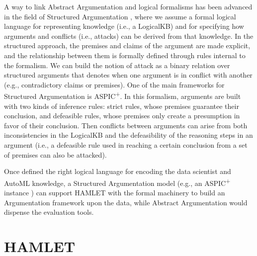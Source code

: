 A way to link Abstract Argumentation and logical formalisms has been advanced in the field of Structured Argumentation \cite{BesnardGHMPST14structured}, where we assume a formal logical language for representing knowledge (i.e., a LogicalKB) and for specifying how arguments and conflicts (i.e., attacks) can be derived from that knowledge. 
In the structured approach, the premises and claims of the argument are made explicit, and the relationship between them is formally defined through rules internal to the formalism.
We can build the notion of attack as a binary relation over structured arguments that denotes when one argument is in conflict with another (e.g., contradictory claims or premises).
One of the main frameworks for Structured Argumentation is ASPIC\textsuperscript{+}\cite{Modgil2014aspic+}.
In this formalism, arguments are built with two kinds of inference rules: strict rules, whose premises guarantee their conclusion, and defeasible rules, whose premises only create a presumption in favor of their conclusion.
Then conflicts between arguments can arise from both inconsistencies in the LogicalKB and the defeasibility of the reasoning steps in an argument (i.e., a defeasible rule used in reaching a certain conclusion from a set of premises can also be attacked).

Once defined the right logical language for encoding the data scientist and AutoML knowledge, a Structured Argumentation model (e.g., an ASPIC\textsuperscript{+} instance \cite{arg2p-jlc}) can support HAMLET with the formal machinery to build an Argumentation framework upon the data, while Abstract Argumentation would dispense the evaluation tools.

\section{HAMLET}\label{hamlet-sec:implementation}

